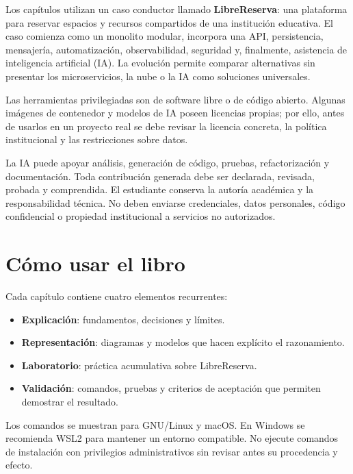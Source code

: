\documentclass[11pt,openany]{book}
\begin{document}
Los capítulos utilizan un caso conductor llamado \textbf{LibreReserva}: una plataforma para reservar espacios y recursos compartidos de una institución educativa. El caso comienza como un monolito modular, incorpora una API, persistencia, mensajería, automatización, observabilidad, seguridad y, finalmente, asistencia de inteligencia artificial (IA). La evolución permite comparar alternativas sin presentar los microservicios, la nube o la IA como soluciones universales.

Las herramientas privilegiadas son de software libre o de código abierto. Algunas imágenes de contenedor y modelos de IA poseen licencias propias; por ello, antes de usarlos en un proyecto real se debe revisar la licencia concreta, la política institucional y las restricciones sobre datos.

\begin{politicaia}
La IA puede apoyar análisis, generación de código, pruebas, refactorización y documentación. Toda contribución generada debe ser declarada, revisada, probada y comprendida. El estudiante conserva la autoría académica y la responsabilidad técnica. No deben enviarse credenciales, datos personales, código confidencial o propiedad institucional a servicios no autorizados.
\end{politicaia}

\section*{Cómo usar el libro}
Cada capítulo contiene cuatro elementos recurrentes:
\begin{itemize}
  \item \textbf{Explicación}: fundamentos, decisiones y límites.
  \item \textbf{Representación}: diagramas y modelos que hacen explícito el razonamiento.
  \item \textbf{Laboratorio}: práctica acumulativa sobre LibreReserva.
  \item \textbf{Validación}: comandos, pruebas y criterios de aceptación que permiten demostrar el resultado.
\end{itemize}

Los comandos se muestran para GNU/Linux y macOS. En Windows se recomienda WSL2 para mantener un entorno compatible. No ejecute comandos de instalación con privilegios administrativos sin revisar antes su procedencia y efecto.

\tableofcontents
\listoffigures
\listoftables

\mainmatter














\appendix



\backmatter

\end{document}
